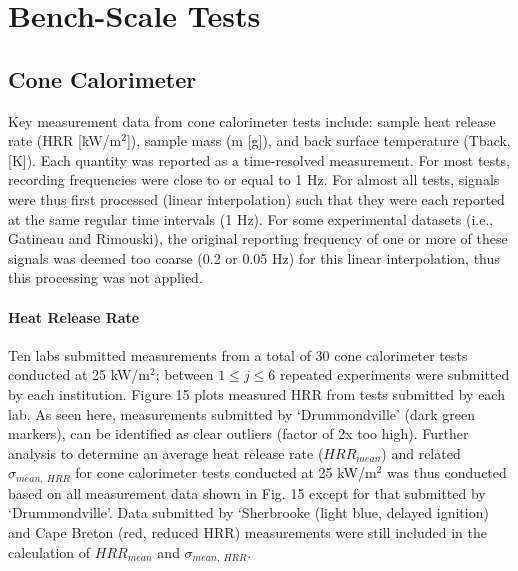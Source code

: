 \documentclass{book}
\begin{document}
\section{Bench-Scale Tests}

\subsection{Cone Calorimeter}

Key measurement data from cone calorimeter tests include: sample heat release rate (HRR [kW/m$^2$]), sample mass (m [g]), and back surface temperature (Tback, [K]). Each quantity was reported as a time-resolved measurement. For most tests, recording frequencies were close to or equal to 1 Hz. For almost all tests, signals were thus first processed (linear interpolation) such that they were each reported at the same regular time intervals (1 Hz). For some experimental datasets (i.e., Gatineau and Rimouski), the original reporting frequency of one or more of these signals was deemed too coarse (0.2 or 0.05 Hz) for this linear interpolation, thus this processing was not applied.

\paragraph{Heat Release Rate}

Ten labs submitted measurements from a total of 30 cone calorimeter tests conducted at 25 kW/m$^2$; between $1\le j\le6$ repeated experiments were submitted by each institution. Figure 15 plots measured HRR from tests submitted by each lab. As seen here, measurements submitted by ‘Drummondville’ (dark green markers), can be identified as clear outliers (factor of 2x too high). Further analysis to determine an average heat release rate ($HRR_{mean}$) and related $\sigma_{mean,\ HRR}$ for cone calorimeter tests conducted at 25 kW/m$^2$ was thus conducted based on all measurement data shown in Fig. 15 except for that submitted by ‘Drummondville’. Data submitted by ‘Sherbrooke (light blue, delayed ignition) and Cape Breton (red, reduced HRR) measurements were still included in the calculation of  $HRR_{mean}$ and $\sigma_{mean,\ HRR}$.
\end{document}
